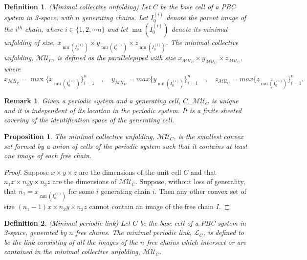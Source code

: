 \documentclass{article}
\newtheorem{definition}{Definition}[section]
\newtheorem{proposition}{Proposition}[section]
\newtheorem{remark}{Remark}[section]
\begin{document}
\begin{definition}(Minimal collective unfolding) Let $C$ be the base cell of a PBC system in 3-space, with $n$ generating chains. Let $I_0^{(i)}$ denote the parent image of the $i^{th}$ chain, where $i \in \{ 1, 2, \cdots n \}$ and let $\operatorname{mu}(I_0^{(i)})$ denote its minimal unfolding of size, $x_{\operatorname{mu}\left(I_0^{(i)}\right)} \times y_{\operatorname{mu}\left(I_0^{(i)}\right)} \times z_{\operatorname{mu}\left(I_0^{(i)}\right)}$. The minimal collective unfolding, $\mathcal{MU}_C$, is defined as the parallelepiped with size $x_{\mathcal{MU}_C}\times y_{\mathcal{MU}_C}\times z_{\mathcal{MU}_C}$, where $\displaystyle x_{\mathcal{MU_C}}=\operatorname{max}  \{ x_{\operatorname{mu}(I_0^{(i)})} \}_{i=1}^n \quad , \quad y_{\mathcal{MU}_C}=max\{ y_{\operatorname{mu}(I_0^{(i)})} \}_{i=1}^n \quad , \quad z_{\mathcal{MU}_C}=max\{ z_{\operatorname{mu}(I_0^{(i)})} \}_{i=1}^n.$ 
\label{MCU}
\end{definition}


\begin{remark}
 Given a periodic system and a generating cell, $C$,  $\mathcal{MU}_C$ is unique and it is independent of its location in the periodic system. It is a finite sheeted covering of the identification space of the generating cell. 
 \end{remark} 
\begin{proposition}
The minimal collective unfolding, $\mathcal{MU}_C$, is the smallest convex set formed by a union of cells of the periodic system such that it contains at least one image of each free chain. 
\label{mu_smallest}
\end{proposition}

\begin{proof}
Suppose $x \times y \times z$ are the dimensions of the unit cell $C$ and that $n_1 x \times n_2 y \times n_3 z$ are the dimensions of $\mathcal{MU}_C$. Suppose, without loss of generality, that $n_1=x_{\operatorname{mu}(I_0^{(i)})}$ for some $i$ generating chain $i$. Then any other convex set of size $(n_1-1) x \times n_2 y \times n_3 z$ cannot contain an image of the free chain $I$. 
\end{proof}


\begin{definition}(Minimal periodic link) Let $C$ be the base cell of a PBC system in 3-space, generated by $n$ free chains. The minimal periodic link, $\mathcal{L}_C$, is defined to be the link consisting of all the images of the $n$ free chains which intersect or are contained in the minimal collective unfolding, $\mathcal{MU}_C$.
\label{FER}
\end{definition}
\end{document}
